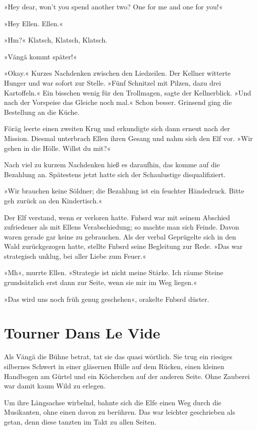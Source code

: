 »Hey dear, won’t you spend another two? One for me and one for you!«

»Hey Ellen. Ellen.«

»Hm?« Klatsch, Klatsch, Klatsch.

»Vängä kommt später!«

»Okay.« Kurzes Nachdenken zwischen den Liedzeilen. Der Kellner witterte Hunger und war sofort zur Stelle. »Fünf Schnitzel mit Pilzen, dazu drei Kartoffeln.« Ein bisschen wenig für den Trollmagen, sagte der Kellnerblick. »Und nach der Vorspeise das Gleiche noch mal.« Schon besser. Grinsend ging die Bestellung an die Küche.

Föräg leerte einen zweiten Krug und erkundigte sich dann erneut nach der Mission. Diesmal unterbrach Ellen ihren Gesang und nahm sich den Elf vor. »Wir gehen in die Hölle. Willst du mit?«

Nach viel zu kurzem Nachdenken hieß es daraufhin, das komme auf die Bezahlung an. Spätestens jetzt hatte sich der Schaulustige disqualifiziert.

»Wir brauchen keine Söldner; die Bezahlung ist ein feuchter Händedruck. Bitte geh zurück an den Kindertisch.«

Der Elf verstand, wenn er verloren hatte. Fnbsrd war mit seinem Abschied zufriedener als mit Ellens Verabschiedung; so machte man sich Feinde. Davon waren gerade gar keine zu gebrauchen. Als der verbal Geprügelte sich in den Wald zurückgezogen hatte, stellte Fnbsrd seine Begleitung zur Rede. »Das war strategisch unklug, bei aller Liebe zum Feuer.«

»Mh«, murrte Ellen. »Strategie ist nicht meine Stärke. Ich räume Steine grundsätzlich erst dann zur Seite, wenn sie mir im Weg liegen.«

»Das wird uns noch früh genug geschehen«, orakelte Fnbsrd düster.


\chapter{Tourner Dans Le Vide}

Als Vängä die Bühne betrat, tat sie das quasi wörtlich. Sie trug ein riesiges silbernes Schwert in einer gläsernen Hülle auf dem Rücken, einen kleinen Handbogen am Gürtel und ein Köcherchen auf der anderen Seite. Ohne Zauberei war damit kaum Wild zu erlegen.

Um ihre Längsachse wirbelnd, bahnte sich die Elfe einen Weg durch die Musikanten, ohne einen davon zu berühren. Das war leichter geschrieben als getan, denn diese tanzten im Takt zu allen Seiten.

